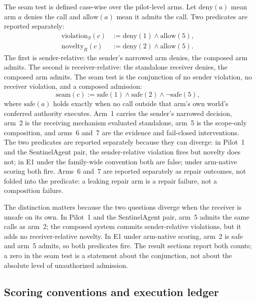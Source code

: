 \documentclass[sigconf,anonymous,nonacm]{acmart}
\begin{document}
The seam test is defined case-wise over the pilot-level arms. Let $\mathrm{deny}(a)$ mean arm $a$ denies the call and $\mathrm{allow}(a)$ mean it admits the call. Two predicates are reported separately:
\begin{align}
\mathrm{violation}_S(c) &:= \mathrm{deny}(1)\land\mathrm{allow}(5), \label{eq:sender}\\
\mathrm{novelty}_R(c) &:= \mathrm{deny}(2)\land\mathrm{allow}(5). \label{eq:receiver}
\end{align}
The first is sender-relative: the sender's narrowed arm denies, the composed arm admits. The second is receiver-relative: the standalone receiver denies, the composed arm admits. The seam test is the conjunction of no sender violation, no receiver violation, and a composed admission:
\begin{equation}
\mathrm{seam}(c):=\mathrm{safe}(1)\land\mathrm{safe}(2)\land\neg\mathrm{safe}(5),
\label{eq:seam}
\end{equation}
where $\mathrm{safe}(a)$ holds exactly when no call outside that arm's own world's conferred authority executes. Arm~1 carries the sender's narrowed decision, arm~2 is the receiving mechanism evaluated standalone, arm~5 is the scope-only composition, and arms~6 and~7 are the evidence and fail-closed interventions. The two predicates are reported separately because they can diverge: in Pilot~1 and the SentinelAgent pair, the sender-relative violation fires but novelty does not; in E1 under the family-wide convention both are false; under arm-native scoring both fire. Arms~6 and~7 are reported separately as repair outcomes, not folded into the predicate: a leaking repair arm is a repair failure, not a composition failure.

The distinction matters because the two questions diverge when the receiver is unsafe on its own. In Pilot~1 and the SentinelAgent pair, arm~5 admits the same calls as arm~2; the composed system commits sender-relative violations, but it adds no receiver-relative novelty. In E1 under arm-native scoring, arm~2 is safe and arm~5 admits, so both predicates fire. The result sections report both counts; a zero in the seam test is a statement about the conjunction, not about the absolute level of unauthorized admission.

\subsection{Scoring conventions and execution ledger}
\label{sec:ledger}
\end{document}
